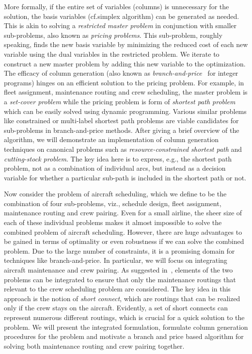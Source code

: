 \documentclass[letterpaper, 10pt, twocolumn, reqno]{amsart}
\begin{document}
More formally, if the entire set of variables (columns) is unnecessary for the solution, the basis variables (cf.\@ simplex algorithm) can be generated as
needed. This is akin to solving a \emph{restricted master problem} in conjunction with smaller sub-problems, also known as \emph{pricing problems}.
This sub-problem, roughly speaking, finds the new basis variable by minimizing the reduced cost of each new variable using the dual variables in the restricted problem. We iterate to construct a new master problem by adding
this new variable to the optimization. The efficacy of column generation (also known as \emph{branch-and-price}~\cite{barnhart1998branch} for integer programs) hinges on an efficient solution to the pricing problem. For example, in
fleet assignment, maintenance routing and crew scheduling, the master problem is a \emph{set-cover problem} while the pricing problem is form of \emph{shortest path problem} which can be easily solved using dynamic programming.
Various similar problems like constrained or multi-label shortest path problems are viable candidates for sub-problems in branch-and-price methods.
After giving a brief overview of the algorithm, we will demonstrate an implementation of column generation techniques on canonical problems such as \emph{resource-constrained shortest path} and \emph{cutting-stock problem}. The key idea here is to express, e.g., the shortest path problem, not as a combination of individual arcs, but instead as a decision variable for whether a particular sub-path is included in the shortest path or not.

Now consider the problem of aircraft scheduling, which we define to be the combination of four sub-problems, viz., schedule design, fleet assignment,
maintenance routing and crew pairing. Even for a small airline, the sheer size of each of these individual problems makes it almost impossible to solve the combined problem of aircraft scheduling. However, there
are huge advantages to be gained in terms of optimality or even robustness if we can solve the combined problem. Due to the large number of constraints, it is a promising domain for techniques like branch-and-price. In particular, we
will focus on integrating aircraft maintenance and crew pairing. As suggested in~\cite{cohn2003improving}, elements of the two problems can be integrated to ensure that only the maintenance routings that relevant to the crew scheduling
problem are considered. The key idea in this approach is the notion of \emph{short connect}, which are routings that can be realized only if the crew stays on the aircraft. Evidently, a set of short connects can represent numerous
different routings, which is crucial for a quick solution to the problem. We will present the integrated formulation, formulate column generation procedures for the problem and motivate a branch and price based algorithm for solving both maintenance routing and crew pairing together.
\end{document}
